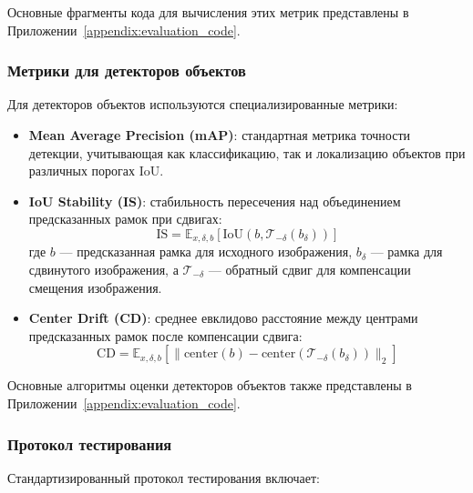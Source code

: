 Основные фрагменты кода для вычисления этих метрик представлены в Приложении~\ref{appendix:evaluation_code}.

\subsubsection{Метрики для детекторов объектов}
\label{sec:evaluation:detection}

Для детекторов объектов используются специализированные метрики:

\begin{itemize}
    \item \textbf{Mean Average Precision (mAP)}: стандартная метрика точности детекции, учитывающая как классификацию, так и локализацию объектов при различных порогах IoU.
    
    \item \textbf{IoU Stability (IS)}: стабильность пересечения над объединением предсказанных рамок при сдвигах:
    \begin{equation}
    \text{IS} = \mathbb{E}_{x, \delta, b} \left[ \text{IoU} \left( b, \mathcal{T}_{-\delta}(b_{\delta}) \right) \right]
    \end{equation}
    где $b$ — предсказанная рамка для исходного изображения, $b_{\delta}$ — рамка для сдвинутого изображения, а $\mathcal{T}_{-\delta}$ — обратный сдвиг для компенсации смещения изображения.
    
    \item \textbf{Center Drift (CD)}: среднее евклидово расстояние между центрами предсказанных рамок после компенсации сдвига:
    \begin{equation}
    \text{CD} = \mathbb{E}_{x, \delta, b} \left[ \| \text{center}(b) - \text{center}(\mathcal{T}_{-\delta}(b_{\delta})) \|_2 \right]
    \end{equation}
\end{itemize}

Основные алгоритмы оценки детекторов объектов также представлены в Приложении~\ref{appendix:evaluation_code}.

\subsubsection{Протокол тестирования}
\label{sec:evaluation:protocol}

Стандартизированный протокол тестирования включает:

